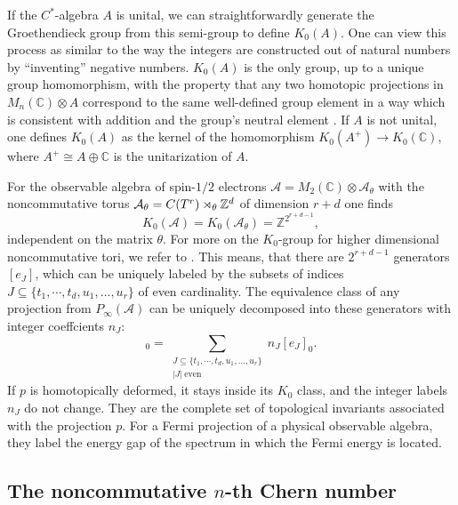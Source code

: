 \documentclass[submission, Phys]{SciPost}
\begin{document}
If the $C^\ast$-algebra $A$ is unital, we can straightforwardly generate the Groethendieck group from this semi-group to define $K_0(A)$.
One can view this process as similar to the way the integers are constructed out of natural numbers by ``inventing'' negative numbers.
$K_0(A)$ is the only group, up to a unique group homomorphism, with the property that 
any two homotopic projections in $M_n(\mathbb{C})\otimes A$ correspond to the same well-defined group element in a way which is consistent with addition and the group's neutral element \cite[Prop.~3.1.8]{Rordam2000}.
If $A$ is not unital, one defines $K_0(A)$ as the kernel of the homomorphism $K_0(A^+)\to K_0(\mathbb{C})$, where $ A^+\cong A\oplus \mathbb{C}$ is the unitarization of $A$.

For the observable algebra of spin-$1/2$ electrons $\mathcal{A}=M_2(\mathbb{C})\otimes\mathcal{A}_\theta$ with the noncommutative torus $\mathcal{A}_\theta=C(T^r)\rtimes_\theta \mathbb{Z}^d$ of dimension $r+d$ one finds \cite[Prop.~4.2.4]{Prodan2017}
\begin{equation}
    K_0(\mathcal{A})=K_0(\mathcal{A}_\theta)=\mathbb{Z}^{2^{r+d-1}},
\end{equation}
independent on the matrix $\theta$. For more on the $K_0$-group for higher dimensional noncommutative tori, we refer to \cite{Rieffel1988}. This means, that there are $2^{r+d-1}$ generators $[e_J]$, which can be uniquely labeled by the subsets of indices $J\subseteq\{t_1, \cdots, t_d, u_1, \ldots, u_r\}$ of even cardinality.
The equivalence class of any projection from $P_\infty(\mathcal{A})$ can be uniquely decomposed into these generators with integer coeffcients $n_J$:
\begin{equation}
    [p]_0 = \sum_{\substack{J\subseteq\{t_1, \cdots, t_d, u_1, \ldots, u_r\}\\ |J|\ \text{even}}} n_J [e_J]_0.
\end{equation}
If $p$ is homotopically deformed, it stays inside its $K_0$ class, and the integer labels $n_J$ do not change.
They are the complete set of topological invariants associated with the projection $p$.
For a Fermi projection of a physical observable algebra, they label the energy gap of the spectrum in which the Fermi energy is located.

\subsection{The noncommutative \texorpdfstring{$n$}{n}-th Chern number}
\label{subsec:chern_numbers}
\end{document}
